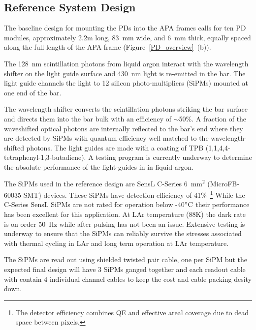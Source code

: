 \subsection{Reference System Design}

The baseline design for mounting the PDs into the APA frames calls for
ten PD modules, approximately 2.2m long, 83~mm wide, and 6~mm thick,
equally spaced along the full length of the APA frame
(Figure~\ref{PD_overview}~(b)). 

The 128~nm scintillation photons from liquid argon interact with the
wavelength shifter on the light guide surface and 430~nm light is
re-emitted in the bar. The light guide channels the light to
12 silicon photo-multipliers (SiPMs) mounted at one end of the bar.

The wavelength shifter converts the scintillation photons striking the
bar surface and directs them into the bar bulk with an efficiency of
$\sim$50\%.  A fraction of the waveshifted optical photons are
internally reflected to the bar's end where they are detected by SiPMs
with quantum efficiency well matched to the wavelength-shifted
photons. The light guides are made with a coating of TPB
(1,1,4,4-tetraphenyl-1,3-butadiene). A testing program is currently
underway to determine the absolute performance of the light-guides in
in liquid argon.

The SiPMs used in the reference design are SensL C-Series 6~mm$^2$
(MicroFB-60035-SMT) devices. These SiPMs have detection efficiency of
41\%~\footnote{The detector efficiency combines QE and effective areal
  coverage due to dead space between pixels.} While the C-Series SensL
SiPMs are not rated for operation below -40$^{\circ}{\rm C}$ their
performance has been excellent for this application. At LAr
temperature (88K) the dark rate is on order 50~Hz while after-pulsing
has not been an issue. Extensive testing is underway to ensure that
the SiPMs can reliably survive the stresses associated with thermal
cycling in LAr and long term operation at LAr temperature.

The SiPMs are read out using shielded twisted pair cable, one per SiPM
but the expected final design will have 3 SiPMs ganged together and
each readout cable with contain 4 individual channel cables to keep
the cost and cable packing desity down.  

